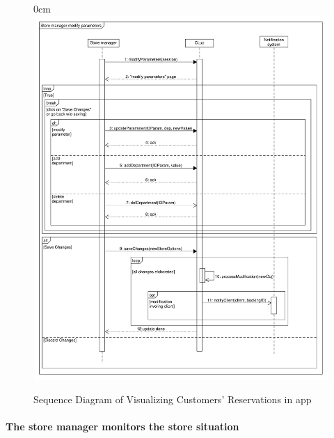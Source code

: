 \documentclass{article}
\begin{document}
\begin{center}
							\begin{figure}[!h]
								\begin{adjustwidth} {0cm}{}
									\centering
									\includegraphics[scale=0.35]{SD/7_modifyParameters.pdf}\\
									\caption{Sequence Diagram of Visualizing Customers' Reservations in app}
								\end{adjustwidth}
							\end{figure}

				\end{center}



\newpage
			
			\paragraph{The store manager monitors the store situation}
			
\end{document}
